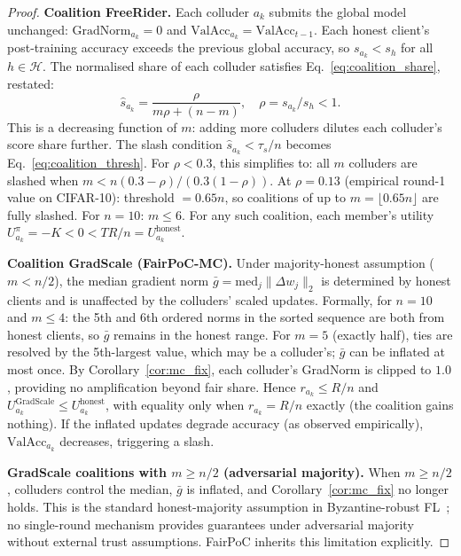 \documentclass[journal]{IEEEtran}
\theoremstyle{definition}
\theoremstyle{remark}
\begin{document}
\begin{proof}
\textbf{Coalition FreeRider.}
Each colluder $a_k$ submits the global model unchanged:
$\mathrm{GradNorm}_{a_k} = 0$ and
$\mathrm{ValAcc}_{a_k} = \mathrm{ValAcc}_{t-1}$.
Each honest client's post-training accuracy exceeds the previous
global accuracy, so $s_{a_k} < s_h$ for all $h \in \mathcal{H}$.
The normalised share of each colluder satisfies
Eq.~\eqref{eq:coalition_share}, restated:
\begin{equation}
  \hat{s}_{a_k} = \frac{\rho}{m\rho + (n{-}m)},
  \quad \rho = s_{a_k}/s_h < 1.
\end{equation}
This is a decreasing function of $m$: adding more colluders
dilutes each colluder's score share further.
The slash condition $\hat{s}_{a_k} < \tau_s/n$ becomes
Eq.~\eqref{eq:coalition_thresh}.
For $\rho < 0.3$, this simplifies to: all $m$ colluders are
slashed when $m < n(0.3 - \rho) / (0.3(1 - \rho))$.
At $\rho = 0.13$ (empirical round-1 value on CIFAR-10):
threshold $= 0.65n$, so coalitions of up to $m = \lfloor 0.65n \rfloor$
are fully slashed.
For $n = 10$: $m \leq 6$.
For any such coalition, each member's utility
$U_{a_k}^\pi = -K < 0 < T R/n = U_{a_k}^{\mathrm{honest}}$.

\textbf{Coalition GradScale (FairPoC-MC).}
Under majority-honest assumption ($m < n/2$), the median gradient
norm $\bar{g} = \mathrm{med}_j \|\Delta w_j\|_2$ is determined by
honest clients and is unaffected by the colluders' scaled updates.
Formally, for $n = 10$ and $m \leq 4$: the 5th and 6th ordered
norms in the sorted sequence are both from honest clients, so
$\bar{g}$ remains in the honest range.
For $m = 5$ (exactly half), ties are resolved by the 5th-largest
value, which may be a colluder's; $\bar{g}$ can be inflated at
most once.
By Corollary~\ref{cor:mc_fix}, each colluder's GradNorm is clipped
to $1.0$, providing no amplification beyond fair share.
Hence $r_{a_k} \leq R/n$ and
$U_{a_k}^{\mathrm{GradScale}} \leq U_{a_k}^{\mathrm{honest}}$,
with equality only when $r_{a_k} = R/n$ exactly (the coalition
gains nothing).
If the inflated updates degrade accuracy (as observed empirically),
$\mathrm{ValAcc}_{a_k}$ decreases, triggering a slash.

\textbf{GradScale coalitions with $m \geq n/2$ (adversarial majority).}
When $m \geq n/2$, colluders control the median, $\bar{g}$ is
inflated, and Corollary~\ref{cor:mc_fix} no longer holds.
This is the standard honest-majority assumption in Byzantine-robust
FL~\cite{blanchard2017krum,cao2020fltrust}; no single-round mechanism
provides guarantees under adversarial majority without external
trust assumptions.
FairPoC inherits this limitation explicitly.
\end{proof}
\end{document}
